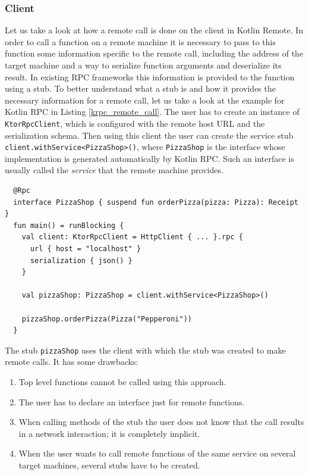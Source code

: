 \documentclass[a4paper,11pt,oneside]{article}
\newcommand{\term}[1]{\textit{#1}}
\newcommand{\kotlini}[1]{\texttt{#1}}
\begin{document}
\subsubsection{Client} \label{client-section}

Let us take a look at how a remote call is done on the client in Kotlin Remote. In order to call
a function on a remote machine it is necessary to pass to this function some information specific
to the remote call, including the address of the target machine and a way to serialize function arguments
and deserialize its result. In existing RPC frameworks this information is provided to the function
using a stub. To better understand what a stub is and how it provides the necessary information for a remote
call, let us take a look at the example for Kotlin RPC in Listing \ref{krpc_remote_call}. The user
has to create an instance of \kotlini{KtorRpcClient}, which is configured with the remote host URL
and the serialization schema. Then using this client the user can create the service stub
\kotlini{client.withService<PizzaShop>()}, where \kotlini{PizzaShop} is the interface whose
implementation is generated automatically by Kotlin RPC. Such an interface is usually called the \term{service}
that the remote machine provides.

\begin{listing}[!h]
  \begin{verbatim}
  @Rpc
  interface PizzaShop { suspend fun orderPizza(pizza: Pizza): Receipt }
  fun main() = runBlocking {
    val client: KtorRpcClient = HttpClient { ... }.rpc {
      url { host = "localhost" }
      serialization { json() }
    }

    val pizzaShop: PizzaShop = client.withService<PizzaShop>()

    pizzaShop.orderPizza(Pizza("Pepperoni"))
  }
  \end{verbatim}
  \caption{Remote function call in Kotlin RPC}\label{krpc_remote_call}
\end{listing}

The stub \kotlini{pizzaShop} uses the client with which the stub was created to make remote calls.
It has some drawbacks:
\begin{enumerate}
  \item Top level functions cannot be called using this approach.
  \item The user has to declare an interface just for remote functions.
  \item When calling methods of the stub the user does not know that the call results in a network 
  interaction; it is completely implicit.
  \item When the user wants to call remote functions of the same service on several target machines, several
  stubs have to be created.
\end{enumerate}
\end{document}
